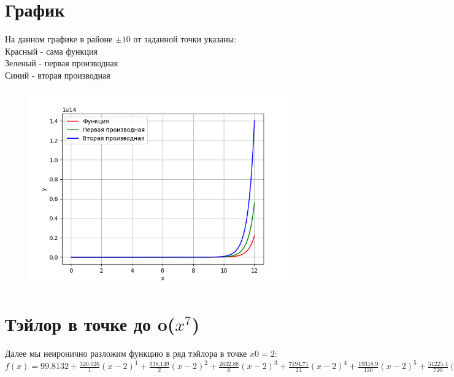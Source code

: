 \documentclass[a4paper]{article}
\begin{document}
\section{График}
На данном графике в районе $\pm 10$ от заданной точки указаны: \\
Красный - сама функция \\
Зеленый - первая производная \\
Синий - вторая производная \\
\begin{figure}[H]
\centering
\includegraphics{graph.png}
\end{figure}\section{Тэйлор в точке до o($x^7$)}
Далее мы неиронично разложим функцию в ряд тэйлора в точке $x0 = 2$: \\
$f(x) = 99.8132 + \frac{320.026}{1}(x-2)^{1} + \frac{938.149}{2}(x-2)^{2} + \frac{2632.88}{6}(x-2)^{3} + \frac{7194.71}{24}(x-2)^{4} + \frac{19318.9}{120}(x-2)^{5} + \frac{51225.4}{720}(x-2)^{6} + \frac{134582}{5040}(x-2)^{7} + o(x^7)$
\end{document}
